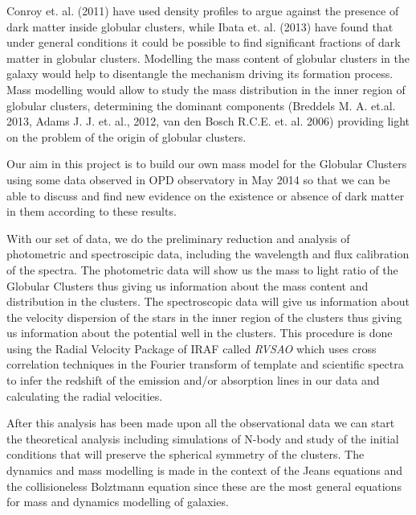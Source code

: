 Conroy et. al. (2011) have used density profiles to argue against the presence of dark matter inside globular clusters, while Ibata et. al. (2013) have found that under general conditions it could be possible to find significant fractions of dark matter in globular clusters. Modelling the mass content of globular clusters in the galaxy would help to disentangle the mechanism driving its formation process. Mass modelling would allow to study the mass distribution in the
inner region of globular clusters, determining the dominant components (Breddels M. A. et.al. 2013, Adams J. J. et. al., 2012, van den Bosch R.C.E. et. al. 2006) providing light on the problem of the origin of globular clusters.

Our aim in this project is to build our own mass model for the Globular Clusters using some data observed in OPD observatory in May 2014 so that we can be able to discuss and find new evidence on the existence or absence of dark matter in them according to these results. 

With our set of data, we do the preliminary reduction and analysis of photometric and spectroscipic data, including the wavelength and flux calibration of the spectra. The photometric data will show us the mass to light ratio of the Globular Clusters thus giving us information about the mass content and distribution in the clusters. The spectroscopic data will give us information about the velocity dispersion of the stars in the inner region of the clusters thus giving us information about the potential well in the clusters. This procedure is done using the Radial Velocity Package of IRAF called \textit{RVSAO} which uses cross correlation techniques in the Fourier transform of template and scientific spectra to infer the redshift of the emission and/or absorption lines in our data and calculating the radial velocities. 

After this analysis has been made upon all the observational data we can start the theoretical analysis including simulations of N-body and study of the initial conditions that will preserve the spherical symmetry of the clusters. The dynamics and mass modelling is made in the context of the Jeans equations and the collisioneless Bolztmann equation since these are the most general equations for mass and dynamics modelling of galaxies.



